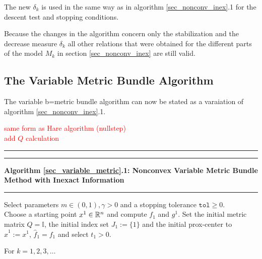 The new \(\delta_k\) is used in the same way as in algorithm \ref{sec_nonconv_inex}.1 for the descent test and stopping conditions.

Because the changes in the algorithm concern only the stabilization and the decrease measure \(\delta_k\) all other relations that were obtained for the different parts of the model \(M_k\) in section \ref{sec_nonconv_inex} are still valid.

\subsection{The Variable Metric Bundle Algorithm}

The variable b=metric bundle algorithm can now be stated as a varaiation of algorithm \ref{sec_nonconv_inex}.1.

\textcolor{red}{same form as Hare algorithm (nullstep)\\
add \(Q\) calculation}

\begin{minipage}\linewidth
\vspace{1em}
\hrule  \vspace{0.4ex} \hrule
\vspace{1ex}
\textbf{Algorithm \ref{sec_variable_metric}.1: Nonconvex Variable Metric Bundle Method with Inexact Information}
\vspace{1ex}
\hrule
\vspace{1ex}
Select parameters \( m \in (0,1), \gamma > 0 \) and a stopping tolerance \( \mathtt{tol} \geq 0\). \\
Choose a starting point \(x^1 \in \mathbb{R}^n\) and compute \(f_1\) and \(g^1\). Set the initial metric matrix \(Q = \mathbb{I}\), the initial index set \(J_1:=\{1\}\) and the initial prox-center to \(\hat{x}^1 := x^1\), \(\hat{f}_1 = f_1\) and select \(t_1 > 0\).
\end{minipage}
For \(k = 1,2,3,  \dotsc \)   

